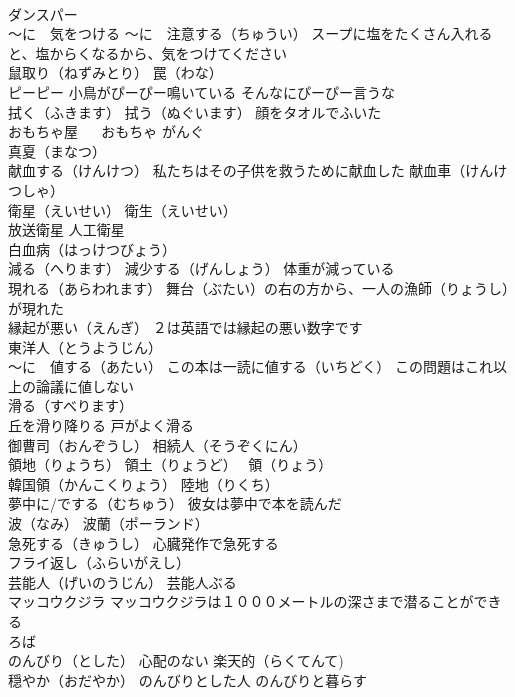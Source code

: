 \documentclass[8pt]{extreport}
\begin{document}
\begin{CJK}{UTF8}{min}
\\	ダンスパー
\\	～に　気をつける ～に　注意する（ちゅうい） スープに塩をたくさん入れると、塩からくなるから、気をつけてください
\\	鼠取り（ねずみとり） 罠（わな）
\\	ピーピー 小鳥がぴーぴー鳴いている そんなにぴーぴー言うな
\\	拭く（ふきます） 拭う（ぬぐいます） 顔をタオルでふいた
\\	おもちゃ屋 　 おもちゃ がんぐ
\\	真夏（まなつ）
\\	献血する（けんけつ） 私たちはその子供を救うために献血した 献血車（けんけつしゃ）
\\	衛星（えいせい） 衛生（えいせい）
\\	放送衛星 人工衛星
\\	白血病（はっけつびょう）
\\	減る（へります） 減少する（げんしょう） 体重が減っている
\\	現れる（あらわれます） 舞台（ぶたい）の右の方から、一人の漁師（りょうし）が現れた
\\	縁起が悪い（えんぎ） ２は英語では縁起の悪い数字です
\\	東洋人（とうようじん）
\\	～に　値する（あたい） この本は一読に値する（いちどく） この問題はこれ以上の論議に値しない
\\	滑る（すべります） 
\\	丘を滑り降りる 戸がよく滑る
\\	御曹司（おんぞうし） 相続人（そうぞくにん）
\\	領地（りょうち） 領土（りょうど） ~領（りょう） 
\\	韓国領（かんこくりょう） 陸地（りくち）
\\	夢中に/でする（むちゅう） 彼女は夢中で本を読んだ
\\	波（なみ） 波蘭（ポーランド）
\\	急死する（きゅうし） 心臓発作で急死する
\\	フライ返し（ふらいがえし）
\\	芸能人（げいのうじん） 芸能人ぶる
\\	マッコウクジラ マッコウクジラは１０００メートルの深さまで潜ることができる
\\	ろば
\\	のんびり（とした） 心配のない 楽天的（らくてんて)　
\\	穏やか（おだやか） のんびりとした人 のんびりと暮らす

\end{CJK}
\end{document}
